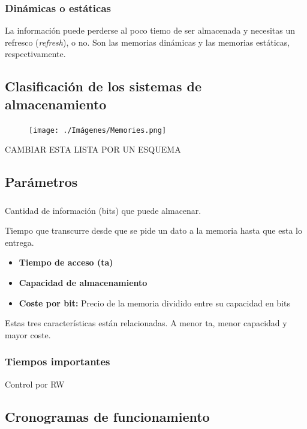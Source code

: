 \documentclass[a4paper]{book}
\begin{document}
\subsubsection{Dinámicas o estáticas}
La información puede perderse al poco tiemo de ser almacenada y necesitas un refresco (\textit{refresh}), o no. Son las memorias dinámicas y las memorias estáticas, respectivamente.

\subsection{Clasificación de los sistemas de almacenamiento}

\begin{figure}[t!]
	\centering
	\texttt{[image: ./Imágenes/Memories.png]}
\end{figure}

CAMBIAR ESTA LISTA POR UN ESQUEMA

\subsection{Parámetros}
\subsubsection{}
Cantidad de información (bits) que puede almacenar.


Tiempo que transcurre desde que se pide un dato a la memoria hasta que esta lo entrega.

\begin{itemize}
	\item \textbf{Tiempo de acceso (ta)}
	\item \textbf{Capacidad de almacenamiento}
	\item \textbf{Coste por bit:} Precio de la memoria dividido entre su capacidad en bits
\end{itemize}

Estas tres características están relacionadas.
A menor ta, menor capacidad y mayor coste.

\subsubsection{Tiempos importantes}


Control por RW


\subsection{Cronogramas de funcionamiento}
\end{document}
